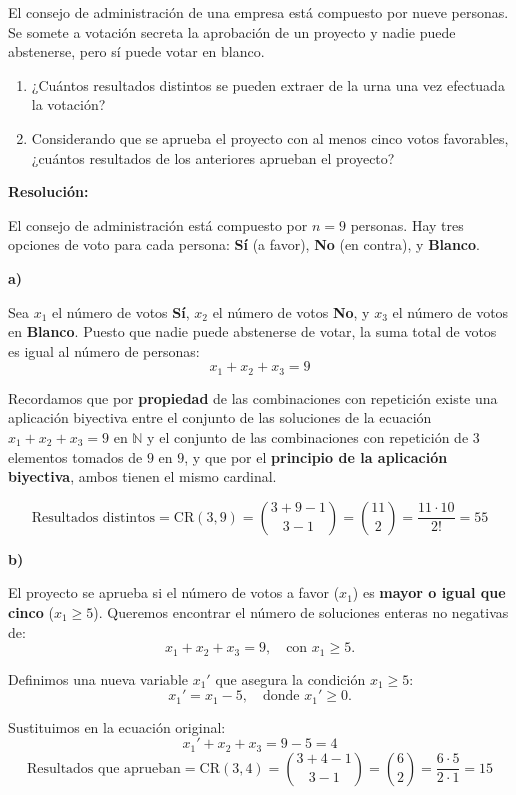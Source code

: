 \documentclass[a4paper,12pt]{article}
\begin{document}
\begin{ejercicio}[title=Ejercicio 35]
El consejo de administración de una empresa está compuesto por nueve personas.  
Se somete a votación secreta la aprobación de un proyecto y nadie puede abstenerse, pero sí puede votar en blanco.

\begin{enumerate}
\item[a)] ¿Cuántos resultados distintos se pueden extraer de la urna una vez efectuada la votación?
\item[b)] Considerando que se aprueba el proyecto con al menos cinco votos favorables, ¿cuántos resultados de los anteriores aprueban el proyecto?
\end{enumerate}

\tcblower
\textbf{Resolución:}

El consejo de administración está compuesto por $n=9$ personas. Hay tres opciones de voto para cada persona: \textbf{Sí} (a favor), \textbf{No} (en contra), y \textbf{Blanco}.

\bigskip

\textbf{a)}

Sea $x_1$ el número de votos \textbf{Sí}, $x_2$ el número de votos \textbf{No}, y $x_3$ el número de votos en \textbf{Blanco}.
Puesto que nadie puede abstenerse de votar, la suma total de votos es igual al número de personas:
\[
x_1 + x_2 + x_3 = 9
\]

Recordamos que por \textbf{propiedad} de las combinaciones con repetición existe una aplicación biyectiva entre el conjunto de las soluciones de la ecuación $x_1+x_2+x_3 = 9$ en $\mathbb{N}$ y el conjunto de las combinaciones con repetición de $3$ elementos tomados de $9$ en $9$, y que por el \textbf{principio de la aplicación biyectiva}, ambos tienen el mismo cardinal.

\[
\text{Resultados distintos} = \mathrm{CR}(3, 9) = \binom{3 + 9 - 1}{3 - 1} = \binom{11}{2} = \frac{11 \cdot 10}{2!} = \boxed{55}
\]

\bigskip

\textbf{b)}

El proyecto se aprueba si el número de votos a favor ($x_1$) es \textbf{mayor o igual que cinco} ($x_1 \ge 5$).
Queremos encontrar el número de soluciones enteras no negativas de:
\[
x_1 + x_2 + x_3 = 9, \quad \text{con } x_1 \ge 5.
\]

Definimos una nueva variable $x_1'$ que asegura la condición $x_1 \ge 5$:
\[
x_1' = x_1 - 5, \quad \text{donde } x_1' \ge 0.
\]

Sustituimos en la ecuación original:
\[
x_1' + x_2 + x_3 = 9 - 5 = 4
\]
\[
\text{Resultados que aprueban} = \mathrm{CR}(3, 4) = \binom{3 + 4 - 1}{3 - 1} = \binom{6}{2} = \frac{6 \cdot 5}{2 \cdot 1} = \boxed{15}
\]

\end{ejercicio}
\end{document}
